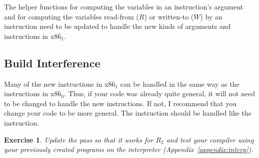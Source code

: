 \documentclass[11pt]{book}
\newtheorem{exercise}[theorem]{Exercise}
\begin{document}
The helper functions for computing the variables in an instruction's
argument and for computing the variables read-from ($R$) or written-to
($W$) by an instruction need to be updated to handle the new kinds of
arguments and instructions in x86$_1$.

\subsection{Build Interference}
\label{sec:build-interference-r2}

Many of the new instructions in x86$_1$ can be handled in the same way
as the instructions in x86$_0$. Thus, if your code was already quite
general, it will not need to be changed to handle the new
instructions. If not, I recommend that you change your code to be more
general. The  instruction should be handled like the
 instruction.



\begin{exercise}\normalfont
Update the  pass so that it works for $R_2$
and test your compiler using your previously created programs on the
 interpreter (Appendix~\ref{appendix:interp}).
\end{exercise}



\end{document}
